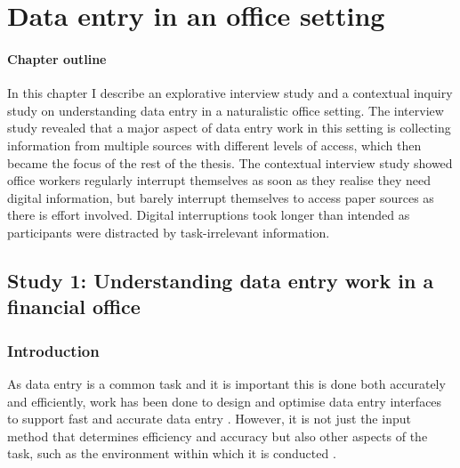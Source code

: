 \chapter{Data entry in an office setting}\label{ch:Study1}
\begin{mynote}
\subsubsection{Chapter outline}

In this chapter I describe an explorative interview study and a contextual inquiry study on understanding data entry in a naturalistic office setting.
The interview study revealed that a major aspect of data entry work in this setting is collecting information from multiple sources with different levels of access, which then became the focus of the rest of the thesis. The contextual interview study showed office workers regularly interrupt themselves as soon as they realise they need digital information, but barely interrupt themselves to access paper sources as there is effort involved. Digital interruptions took longer than intended as participants were distracted by task-irrelevant information.

\end{mynote}

\section{Study 1: Understanding data entry work in a financial office}\label{ch:Study1}
 
\subsection{Introduction}
As data entry is a common task and it is important this is done both accurately and efficiently, work has been done to design and optimise data entry interfaces to support fast and accurate data entry \citep[e.g.][]{Oladimeji2013, Vertanen2015, Wiseman2013a}.
However, it is not just the input method that determines efficiency and accuracy but also other aspects of the task, such as the environment within which it is conducted \citep{Payne2013, Randall2014}.

